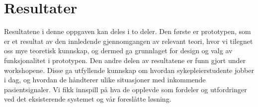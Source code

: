 \chapter{Resultater}
\label{chp:resultater}

Resultatene i denne oppgaven kan deles i to deler. Den første er prototypen, som er et resultat av den innledende gjennomgangen av relevant teori, hvor vi tilegnet oss mye teoretisk kunnskap, og dermed ga grunnlaget for design og valg av funksjonalitet i prototypen. Den andre delen av resultatene er funn gjort under workshopene. Disse ga utfyllende kunnskap om hvordan sykepleierstudente jobber i dag, og hvordan de håndterer ulike situasjoner med inkommende pasientsignaler. Vi fikk innspill på hva de opplevde som fordeler og utfordringer ved det eksisterende systemet og vår foreslåtte løsning. 